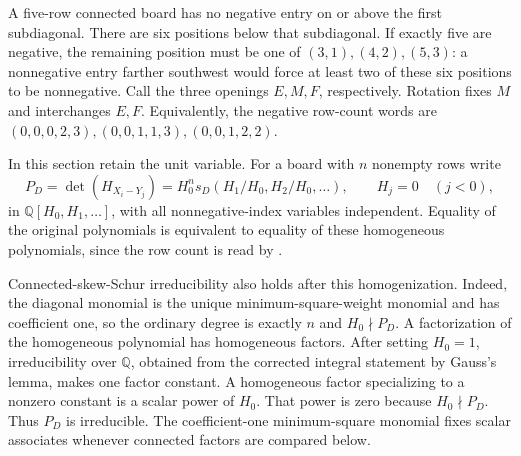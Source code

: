 \documentclass[11pt,a4paper]{amsart}
\numberwithin{equation}{section}
\theoremstyle{plain}
\theoremstyle{definition}
\newcommand{\Q}{\mathbb Q}
\begin{document}
A five-row connected board has no negative entry on or above the first
subdiagonal.  There are six positions below that subdiagonal.  If exactly
five are negative, the remaining position must be one of
\((3,1),(4,2),(5,3)\): a nonnegative entry farther southwest would force
at least two of these six positions to be nonnegative.  Call the three
openings \(E,M,F\), respectively.  Rotation fixes \(M\) and interchanges
\(E,F\).  Equivalently, the negative row-count words are
\((0,0,0,2,3),(0,0,1,1,3),(0,0,1,2,2)\).  

In this section retain the unit variable.  For a board with \(n\) nonempty
rows write
\[
 P_D=\det(H_{X_i-Y_j})
     =H_0^n s_D(H_1/H_0,H_2/H_0,\ldots),
 \qquad H_j=0\quad(j<0),
\]
in \(\Q[H_0,H_1,\ldots]\), with all nonnegative-index variables
independent.  Equality of the original polynomials is equivalent to
equality of these homogeneous polynomials, since the row count is read
by .  

Connected-skew-Schur irreducibility
\cite{Barekat2009CoincidencesCorrigendum} also holds after this
homogenization.  Indeed, the diagonal monomial is the unique
minimum-square-weight monomial and has coefficient one, so the ordinary
degree is exactly \(n\) and \(H_0\nmid P_D\).  A factorization of the
homogeneous polynomial has homogeneous factors.  After setting
\(H_0=1\), irreducibility over \(\Q\), obtained from the corrected
integral statement by Gauss's lemma, makes one factor constant.  A
homogeneous factor specializing to a nonzero constant is a scalar power
of \(H_0\).  That power is zero because \(H_0\nmid P_D\).  Thus \(P_D\)
is irreducible.  The coefficient-one minimum-square monomial fixes scalar
associates whenever connected factors are compared below.  
\end{document}
